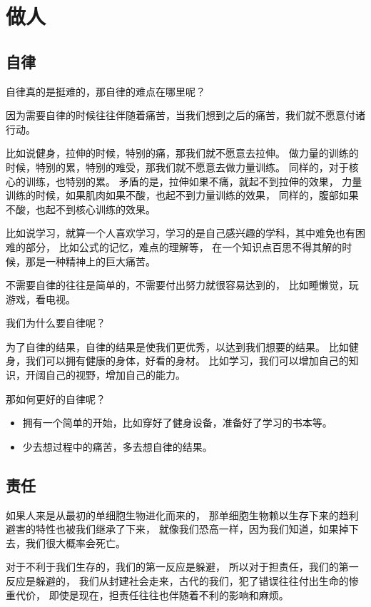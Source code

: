 
\chapter{做人}


\section{自律}
自律真的是挺难的，那自律的难点在哪里呢？

因为需要自律的时候往往伴随着痛苦，当我们想到之后的痛苦，我们就不愿意付诸行动。

比如说健身，拉伸的时候，特别的痛，那我们就不愿意去拉伸。
做力量的训练的时候，特别的累，特别的难受，那我们就不愿意去做力量训练。
同样的，对于核心的训练，也特别的累。
矛盾的是，拉伸如果不痛，就起不到拉伸的效果，
力量训练的时候，如果肌肉如果不酸，也起不到力量训练的效果，
同样的，腹部如果不酸，也起不到核心训练的效果。

比如说学习，就算一个人喜欢学习，学习的是自己感兴趣的学科，其中难免也有困难的部分，
比如公式的记忆，难点的理解等，
在一个知识点百思不得其解的时候，那是一种精神上的巨大痛苦。

不需要自律的往往是简单的，不需要付出努力就很容易达到的，
比如睡懒觉，玩游戏，看电视。

我们为什么要自律呢？

为了自律的结果，自律的结果是使我们更优秀，以达到我们想要的结果。
比如健身，我们可以拥有健康的身体，好看的身材。
比如学习，我们可以增加自己的知识，开阔自己的视野，增加自己的能力。

那如何更好的自律呢？
\begin{itemize}
\item 拥有一个简单的开始，比如穿好了健身设备，准备好了学习的书本等。
\item 少去想过程中的痛苦，多去想自律的结果。
\end{itemize}


\section{责任}

如果人来是从最初的单细胞生物进化而来的，
那单细胞生物赖以生存下来的趋利避害的特性也被我们继承了下来，
就像我们恐高一样，因为我们知道，如果掉下去，我们很大概率会死亡。

对于不利于我们生存的，我们的第一反应是躲避，
所以对于担责任，我们的第一反应是躲避的，
我们从封建社会走来，古代的我们，犯了错误往往付出生命的惨重代价，
即使是现在，担责任往往也伴随着不利的影响和麻烦。

